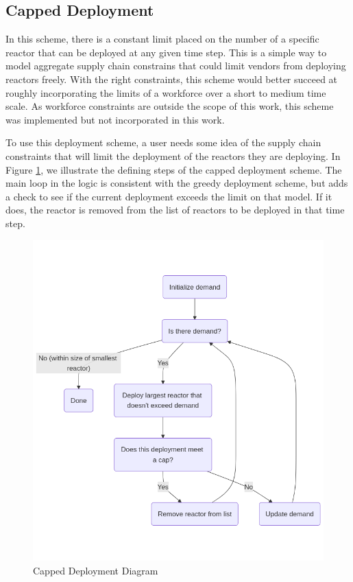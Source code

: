 \subsection{Capped Deployment}
In this scheme, there is a constant limit placed on the number of a specific reactor that can be deployed at any given time step. This is a simple way to model aggregate supply chain constrains that could limit vendors from deploying reactors freely. With the right constraints, this scheme would better succeed at roughly incorporating the limits of a workforce over a short to medium time scale. As workforce constraints are outside the scope of this work, this scheme was implemented but not incorporated in this work.

To use this deployment scheme, a user needs some idea of the supply chain constraints that will limit the deployment of the reactors they are deploying. In Figure \ref{fig:cap_diagram}, we illustrate the defining steps of the capped deployment scheme. The main loop in the logic is consistent with the greedy deployment scheme, but adds a check to see if the current deployment exceeds the limit on that model. If it does, the reactor is removed from the list of reactors to be deployed in that time step.

\begin{figure}[!htbp]
    \centering
    \includegraphics[scale=0.4]{images/schemes/cap_diagram.png}
    \caption{Capped Deployment Diagram}
    \label{fig:cap_diagram}
\end{figure}

